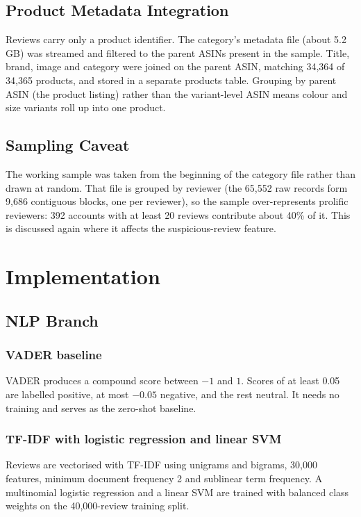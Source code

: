 \documentclass[12pt,a4paper]{report}
\begin{document}
\section{Product Metadata Integration}
Reviews carry only a product identifier. The category's metadata file (about 5.2 GB) was streamed and filtered to the parent ASINs present in the sample. Title, brand, image and category were joined on the parent ASIN, matching 34,364 of 34,365 products, and stored in a separate products table. Grouping by parent ASIN (the product listing) rather than the variant-level ASIN means colour and size variants roll up into one product.

\section{Sampling Caveat}
The working sample was taken from the beginning of the category file rather than drawn at random. That file is grouped by reviewer (the 65,552 raw records form 9,686 contiguous blocks, one per reviewer), so the sample over-represents prolific reviewers: 392 accounts with at least 20 reviews contribute about 40\% of it. This is discussed again where it affects the suspicious-review feature.

\chapter{Implementation}
\section{NLP Branch}
\subsection{VADER baseline}
VADER produces a compound score between $-1$ and $1$. Scores of at least 0.05 are labelled positive, at most $-0.05$ negative, and the rest neutral. It needs no training and serves as the zero-shot baseline.
\subsection{TF-IDF with logistic regression and linear SVM}
Reviews are vectorised with TF-IDF using unigrams and bigrams, 30,000 features, minimum document frequency 2 and sublinear term frequency. A multinomial logistic regression and a linear SVM are trained with balanced class weights on the 40,000-review training split.
\end{document}
